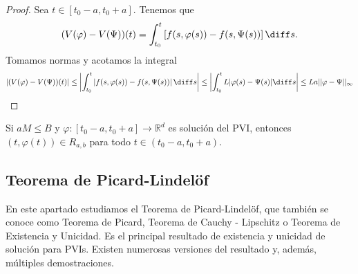 \documentclass{article}
\begin{document}
\begin{proof}
  Sea $t \in [t_0-a, t_0+a]$. Tenemos que
  \[ (V(\varphi) - V(\Psi))(t) = \int_{t_{0}}^t \left[f(s, \varphi(s)) - f(s, \Psi(s))\right] \diff
    s.\] Tomamos normas y acotamos la integral
  \[|(V(\varphi) - V(\Psi))(t)| \le \left|\int_{t_{0}}^t \left|f(s, \varphi(s)) - f(s,
        \Psi(s))\right| \diff s\right| \le \left|\int_{t_{0}}^t L |\varphi(s) - \Psi(s)| \diff s
    \right| \le L a ||\varphi - \Psi||_{\infty}\] \qedhere
\end{proof}

\begin{rem}
  Si $a M \le B$ y $\varphi: [t_0-a, t_0+a] \to \mathbb{R}^d$ es solución del PVI, entonces
  $(t, \varphi(t)) \in R_{a,b}$ para todo $t \in (t_0-a, t_0+a)$.
\end{rem}

\subsection{Teorema de Picard-Lindelöf}

En este apartado estudiamos el Teorema de Picard-Lindelöf, que también se conoce como Teorema de
Picard, Teorema de Cauchy - Lipschitz o Teorema de Existencia y Unicidad. Es el principal resultado
de existencia y unicidad de solución para PVIs. Existen numerosas versiones del resultado y, además,
múltiples demostraciones.
\end{document}
